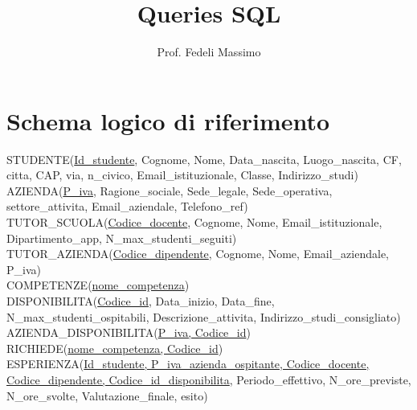 \documentclass[a4paper,12pt]{article}
\title{Queries SQL}
\author{Prof. Fedeli Massimo}
\date{}
\begin{document}
\maketitle

\section*{Schema logico di riferimento}

\begin{flushleft}
STUDENTE(\underline{Id\_studente}, Cognome, Nome, Data\_nascita, Luogo\_nascita, CF, citta, CAP, via, n\_civico, Email\_istituzionale, Classe, Indirizzo\_studi) \\
AZIENDA(\underline{P\_iva}, Ragione\_sociale, Sede\_legale, Sede\_operativa, settore\_attivita, Email\_aziendale, Telefono\_ref) \\
TUTOR\_SCUOLA(\underline{Codice\_docente}, Cognome, Nome, Email\_istituzionale, Dipartimento\_app, N\_max\_studenti\_seguiti) \\
TUTOR\_AZIENDA(\underline{Codice\_dipendente}, Cognome, Nome, Email\_aziendale, P\_iva) \\
COMPETENZE(\underline{nome\_competenza}) \\
DISPONIBILITA(\underline{Codice\_id}, Data\_inizio, Data\_fine, N\_max\_studenti\_ospitabili, Descrizione\_attivita, Indirizzo\_studi\_consigliato) \\
AZIENDA\_DISPONIBILITA(\underline{P\_iva, Codice\_id}) \\
RICHIEDE(\underline{nome\_competenza, Codice\_id}) \\
ESPERIENZA(\underline{Id\_studente, P\_iva\_azienda\_ospitante, Codice\_docente, Codice\_dipendente, Codice\_id\_disponibilita}, Periodo\_effettivo, N\_ore\_previste, N\_ore\_svolte, Valutazione\_finale, esito)
\end{flushleft}
\end{document}
